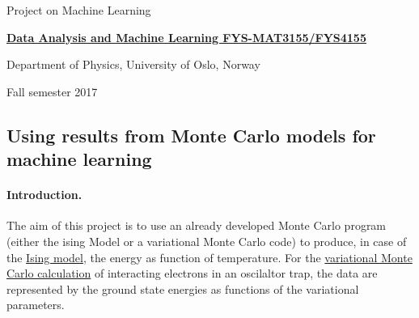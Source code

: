 \documentclass[%
oneside,                 %
final,                   %
10pt]{article}
\begin{document}

\newcommand{\exercisesection}[1]{\subsection*{#1}}






\thispagestyle{empty}

\begin{center}
{\LARGE\bf
\begin{spacing}{1.25}
Project on Machine Learning
\end{spacing}
}
\end{center}


\begin{center}
{\bf \href{{http://www.uio.no/studier/emner/matnat/fys/FYS3155/index-eng.html}}{Data Analysis and Machine Learning FYS-MAT3155/FYS4155}}
\end{center}

    \begin{center}
\centerline{{\small Department of Physics, University of Oslo, Norway}}
\end{center}
    

\begin{center}
Fall semester 2017
\end{center}

\vspace{1cm}


\subsection*{Using results from Monte Carlo models for machine learning}

\paragraph{Introduction.}
The aim of this project is to use an already developed Monte Carlo program (either the ising Model or a variational Monte Carlo code) to produce, in case of the \href{{https://github.com/CompPhysics/MachineLearning/tree/master/doc/Programs/IsingModel}}{Ising model}, the energy as function of temperature. For the \href{{https://github.com/CompPhysics/MachineLearning/tree/master/doc/Programs/VMC2Electrons/}}{variational Monte Carlo calculation} of interacting electrons in an oscilaltor trap, the data are represented by the ground state energies as functions of the variational parameters.
\end{document}
